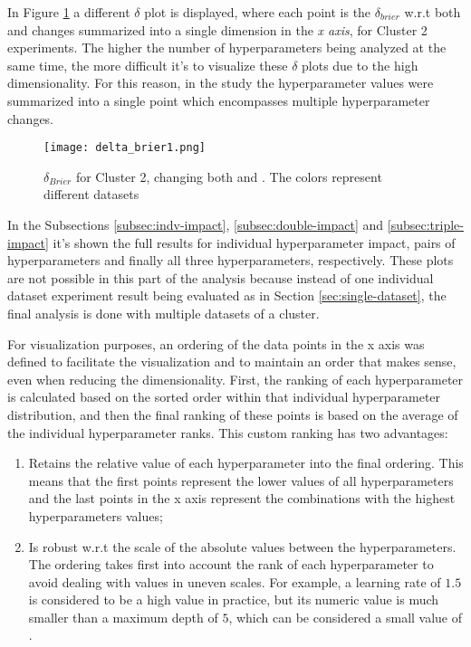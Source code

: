 In Figure \ref{fig:delta-brier1} a different $\delta$ plot is displayed, where each point is the $\delta_{brier}$ w.r.t both  and  changes summarized into a single dimension in the \textit{x axis}, for Cluster 2 experiments. The higher the number of hyperparameters being analyzed at the same time, the more difficult it's to visualize these $\delta$ plots due to the high dimensionality. For this reason, in the study the hyperparameter values were summarized into a single point which encompasses multiple hyperparameter changes.

\begin{figure}[!h]
    \centering
    \texttt{[image: delta\_brier1.png]}
    \caption{$\delta_{Brier}$ for Cluster 2, changing both  and . The colors represent different datasets}
    \label{fig:delta-brier1}
\end{figure}


In the Subsections \ref{subsec:indv-impact}, \ref{subsec:double-impact} and \ref{subsec:triple-impact} it's shown the full results for individual hyperparameter impact, pairs of hyperparameters and finally all three hyperparameters, respectively. These plots are not possible in this part of the analysis because instead of one individual dataset experiment result being evaluated as in Section \ref{sec:single-dataset}, the final analysis is done with multiple datasets of a cluster.

For visualization purposes, an ordering of the data points in the x axis was defined to facilitate the visualization and to maintain an order that makes sense, even when reducing the dimensionality. First, the ranking of each hyperparameter is calculated based on the sorted order within that individual hyperparameter distribution, and then the final ranking of these points is based on the average of the individual hyperparameter ranks. This custom ranking has two advantages:

\begin{enumerate}
    \item Retains the relative value of each hyperparameter into the final ordering. This means that the first points represent the lower values of all hyperparameters and the last points in the x axis represent the combinations with the highest hyperparameters values;
    \item Is robust w.r.t the scale of the absolute values between the hyperparameters. The ordering takes first into account the rank of each hyperparameter to avoid dealing with values in uneven scales. For example, a learning rate of $1.5$ is considered to be a high value in practice, but its numeric value is much smaller than a maximum depth of $5$, which can be considered a small value of .
\end{enumerate}


